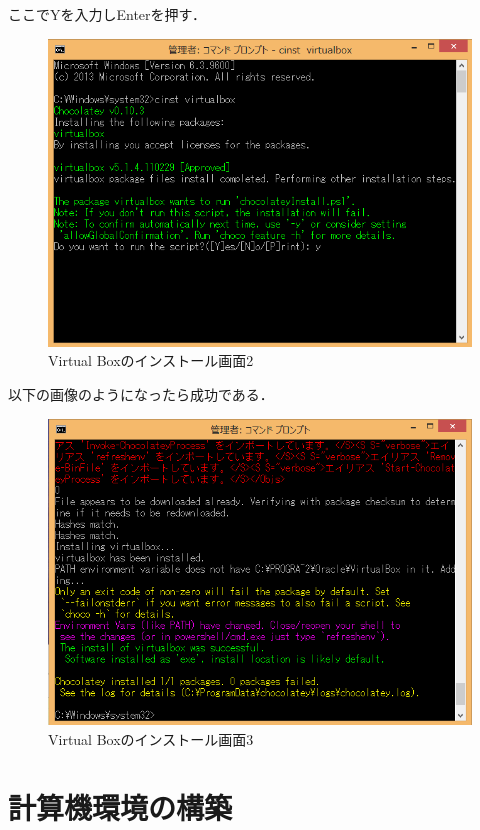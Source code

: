 \newpage
ここでYを入力しEnterを押す．

\begin{figure}[htb]
\centering
\includegraphics[width=15cm]{vb-cmd2.png}
\caption{Virtual Boxのインストール画面2}\label{vbinst2}
\end{figure}

\newpage


以下の画像のようになったら成功である．

\begin{figure}[htb]
\centering
\includegraphics[width=15cm]{vb-cmd3.png}
\caption{Virtual Boxのインストール画面3}\label{vbinst3}
\end{figure}

\newpage

\section{計算機環境の構築}

